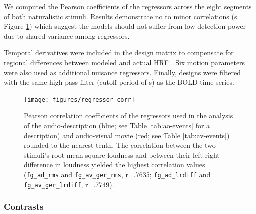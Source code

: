 \documentclass[english]{article}
\begin{document}
We computed the Pearson coefficients of the regressors across the eight segments
of both naturalistic stimuli. Results demonstrate no to minor correlations (s.
Figure \ref{fig:reg-corr}) which suggest the models should not suffer from low
detection power due to shared variance among regressors.
%


Temporal derivatives were included in the design matrix to compensate for
regional differences between modeled and actual HRF \citep{friston1998event}.
Six motion parameters were also used as additional nuisance regressors.
Finally, designs were filtered with the same high-pass filter (cutoff period of
\unit[150]{s}) as the BOLD time series.




\begin{figure} \centering
    \texttt{[image: figures/regressor-corr]} \caption{Pearson
        correlation coefficients  of the regressors used in the analysis of the
        audio-description (blue; see Table \ref{tab:ao-events} for a
        description) and audio-visual movie (red; see Table \ref{tab:av-events})
        rounded to the nearest tenth.  The correlation between the two stimuli's
        root mean square loudness and between their left-right difference in
        loudness yielded the highest correlation values
        (\texttt{fg\_ad\_rms} and \texttt{fg\_av\_ger\_rms}, r=.7635;
        \texttt{fg\_ad\_lrdiff} and \texttt{fg\_av\_ger\_lrdiff}, r=.7749).}
\label{fig:reg-corr}
\end{figure}


\subsubsection{Contrasts}

\end{document}

